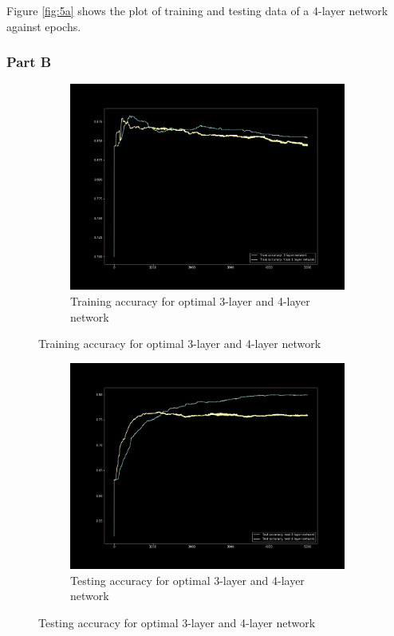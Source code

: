 Figure \ref{fig:5a} shows the plot of training and testing data of a 4-layer network against epochs.

\subsubsection{Part B}

\begin{figure}[H]
    \begin{subfigure}{1\textwidth}
        \centering
        \includegraphics[width=0.8\linewidth]{assets/plots/part1_Q5b_3.png}
        \caption{Training accuracy for optimal 3-layer and 4-layer network}
        \label{fig:train_34}
    \end{subfigure}
\end{figure}
\begin{figure}[H]
    \ContinuedFloat
    \begin{subfigure}{1\textwidth}
        \centering
        \includegraphics[width=0.8\linewidth]{assets/plots/part1_Q5b_2.png}
        \caption{Testing accuracy for optimal 3-layer and 4-layer network}
        \label{fig:test_34}
    \end{subfigure}
\end{figure}


